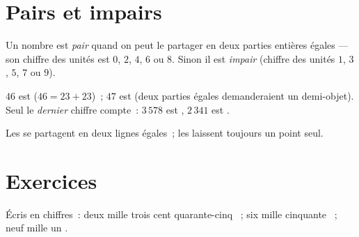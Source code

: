 \section{Pairs et impairs}

\begin{definition}\label{def:g3:numbers:evenodd}
Un nombre est \emph{pair} quand on peut le
partager en deux parties entières égales --- son chiffre des
unités est $0$, $2$, $4$, $6$ ou $8$. Sinon il est
\emph{impair} (chiffre des unités $1$, $3$,
$5$, $7$ ou $9$).
\end{definition}

\begin{example}
$46$ est  ($46 = 23 + 23$)~; $47$ est  (deux parties
égales demanderaient un demi-objet). Seul le \emph{dernier} chiffre
compte~: $3\,578$ est , $2\,341$ est .
\end{example}

\begin{omfigure}

{\small Les  se partagent en deux lignes égales~; les
 laissent toujours un point seul.}
\end{omfigure}

\section{Exercices}

\begin{exercise}[$\star$]\label{exo:g3:numbers:1}
Écris en chiffres~: \guillemotleft{} deux mille trois cent
quarante-cinq \guillemotright{}~; \guillemotleft{} six mille
cinquante \guillemotright{}~; \guillemotleft{} neuf mille un
\guillemotright{}.
\end{exercise}

